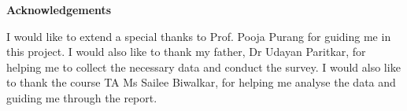 \documentclass[../main.tex]{subfiles}
\begin{document}
\newpage
\thispagestyle{plain}
\begin{center}
    \Large{\textbf{Acknowledgements}} 
\end{center}
I would like to extend a special thanks to Prof. Pooja Purang for guiding me in this project. I would also like to thank my father, Dr Udayan Paritkar, for helping me to collect the necessary data and conduct the survey. I would also like to thank the course TA Ms Sailee Biwalkar, for helping me analyse the data and guiding me through the report.
\end{document}

